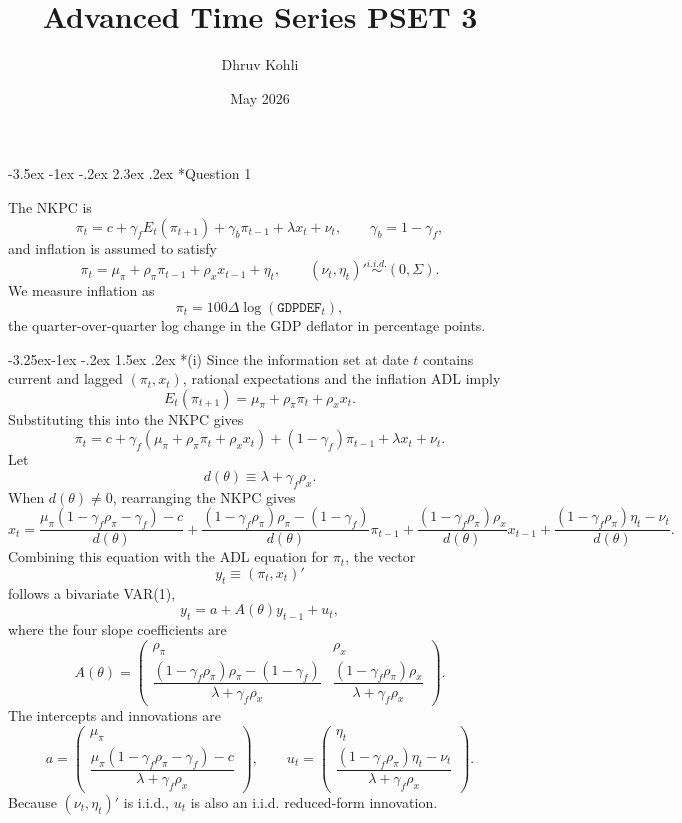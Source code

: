\documentclass[11pt]{article}
\title{Advanced Time Series PSET 3}
\author{Dhruv Kohli}
\date{May 2026}
\makeatletter
\renewcommand\section{\@startsection{section}{1}{\z@}%
  {-3.5ex \@plus -1ex \@minus -.2ex}%
  {2.3ex \@plus .2ex}%
  {\normalfont\Large}}
\renewcommand\subsection{\@startsection{subsection}{2}{\z@}%
  {-3.25ex\@plus -1ex \@minus -.2ex}%
  {1.5ex \@plus .2ex}%
  {\normalfont\large}}
\makeatother
\begin{document}
\maketitle

\section*{Question 1}

The NKPC is
\[
\pi_t
=c+\gamma_f E_t(\pi_{t+1})+\gamma_b\pi_{t-1}+\lambda x_t+\nu_t,
\qquad
\gamma_b=1-\gamma_f,
\]
and inflation is assumed to satisfy
\[
\pi_t=\mu_\pi+\rho_\pi\pi_{t-1}+\rho_x x_{t-1}+\eta_t,
\qquad
(\nu_t,\eta_t)' \overset{i.i.d.}{\sim} (0,\Sigma).
\]
We measure inflation as
\[
\pi_t=100\Delta\log(\texttt{GDPDEF}_t),
\]
the quarter-over-quarter log change in the GDP deflator in percentage points.

\subsection*{(i)}
Since the information set at date \(t\) contains current and lagged \((\pi_t,x_t)\), rational
expectations and the inflation ADL imply
\[
E_t(\pi_{t+1})=\mu_\pi+\rho_\pi\pi_t+\rho_x x_t.
\]
Substituting this into the NKPC gives
\[
\pi_t
=c+\gamma_f(\mu_\pi+\rho_\pi\pi_t+\rho_x x_t)
+(1-\gamma_f)\pi_{t-1}+\lambda x_t+\nu_t.
\]
Let
\[
d(\theta)\equiv \lambda+\gamma_f\rho_x.
\]
When \(d(\theta)\neq 0\), rearranging the NKPC gives
\[
x_t
=
\frac{\mu_\pi(1-\gamma_f\rho_\pi-\gamma_f)-c}{d(\theta)}
+\frac{(1-\gamma_f\rho_\pi)\rho_\pi-(1-\gamma_f)}{d(\theta)}\pi_{t-1}
+\frac{(1-\gamma_f\rho_\pi)\rho_x}{d(\theta)}x_{t-1}
+\frac{(1-\gamma_f\rho_\pi)\eta_t-\nu_t}{d(\theta)}.
\]
Combining this equation with the ADL equation for \(\pi_t\), the vector
\[
y_t\equiv(\pi_t,x_t)'
\]
follows a bivariate VAR(1),
\[
y_t=a+A(\theta)y_{t-1}+u_t,
\]
where the four slope coefficients are
\[
A(\theta)
=
\begin{pmatrix}
\rho_\pi & \rho_x\\[4pt]
\dfrac{(1-\gamma_f\rho_\pi)\rho_\pi-(1-\gamma_f)}
{\lambda+\gamma_f\rho_x}
&
\dfrac{(1-\gamma_f\rho_\pi)\rho_x}
{\lambda+\gamma_f\rho_x}
\end{pmatrix}.
\]
The intercepts and innovations are
\[
a=
\begin{pmatrix}
\mu_\pi\\[3pt]
\dfrac{\mu_\pi(1-\gamma_f\rho_\pi-\gamma_f)-c}{\lambda+\gamma_f\rho_x}
\end{pmatrix},
\qquad
u_t=
\begin{pmatrix}
\eta_t\\[3pt]
\dfrac{(1-\gamma_f\rho_\pi)\eta_t-\nu_t}{\lambda+\gamma_f\rho_x}
\end{pmatrix}.
\]
Because \((\nu_t,\eta_t)'\) is i.i.d., \(u_t\) is also an i.i.d. reduced-form innovation.
\end{document}
